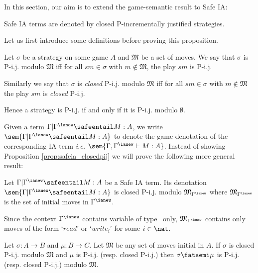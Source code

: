 In this section, our aim is to extend the game-semantic result to
Safe IA:
\begin{proposition}
\label{prop:safeia_closedpij} Safe IA terms are denoted by closed
P-incrementally justified strategies.
\end{proposition}


Let us first introduce some definitions before proving this
proposition.

\begin{definition}
\label{def:pij_modulo} Let $\sigma$ be a strategy on some game $A$
and $\mathfrak{M}$ be a set of moves. We say that $\sigma$ is P-i.j.
modulo $\mathfrak{M}$ iff for all $s m \in \sigma$ with $m \not\in
\mathfrak{M}$, the play $s m$ is P-i.j.

Similarly we say that $\sigma$ is \emph{closed} P-i.j. modulo
$\mathfrak{M}$ iff for all $s m \in \sigma$ with $m \not\in
\mathfrak{M}$ the play $s m$ is \emph{closed} P-i.j.

Hence a strategy is P-i.j. if and only if it is P-i.j. modulo
$\emptyset$.
\end{definition}

Given a term $\Gamma | \Gamma^{\ianew} \safeentail M : A$, we write
$\sem{\Gamma | \Gamma^{\ianew} \safeentail M : A}$ to denote the
game denotation of the corresponding IA term {\it i.e.}
$\sem{\Gamma, \Gamma^{\ianew} \vdash M : A}$. Instead of showing
Proposition \ref{prop:safeia_closedpij} we will prove the following
more general result:
\begin{proposition}
\label{prop:safeia_closedpijmodulo} Let $\Gamma | \Gamma^{\ianew}
\safeentail M : A $ be a Safe IA term. Its denotation $\sem{\Gamma |
\Gamma^{\ianew} \safeentail M : A}$ is closed P-i.j. modulo
$\mathfrak{M}_{\Gamma^{\ianew}}$ where
$\mathfrak{M}_{\Gamma^{\ianew}}$ is the set of initial moves in
$\Gamma^{\ianew}$.
\end{proposition}

\begin{remark}
Since the context $\Gamma^{\ianew}$ contains variable of type
\iavar\ only, $\mathfrak{M}_{\Gamma^{\ianew}}$ contains only moves
of the form `$read$' or `$write_i$' for some $i\in \nat$.
\end{remark}

\begin{lemma}
\label{lem:leftcompos_preserv_pijmodulo}
 Let $\sigma : A \rightarrow
B$ and $\mu : B \rightarrow C$.
  Let $\mathfrak{M}$ be any set of moves initial in $A$.
  If $\sigma$ is closed  P-i.j. modulo $\mathfrak{M}$ and $\mu$ is
  P-i.j. (resp. closed P-i.j.) then $\sigma \fatsemi \mu$ is P-i.j. (resp. closed P-i.j.) modulo $\mathfrak{M}$.
\end{lemma}



